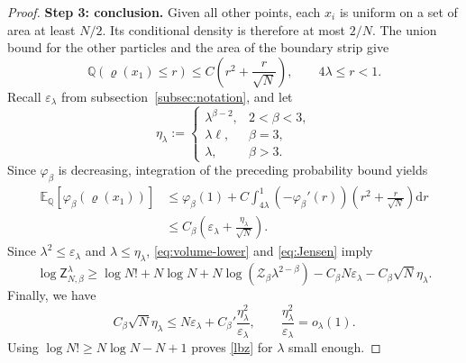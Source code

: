 \documentclass[a4paper,10pt,leqno]{amsart}
\numberwithin{equation}{section}
\newcommand{\dd}{\mathrm{d}}
\def\Esp{\mathbb{E}}
\def\mc{\mathcal}
\def\Z{\mathsf{Z}_{N,\beta}^{\lambda}}
\begin{document}
\begin{proof}
  \smallskip
  \noindent
  \textbf{Step 3: conclusion.}
  Given all other points, each $x_i$ is uniform on a set of area at least $N/2$. Its conditional density is therefore at most $2/N$. The union bound for the other particles and the area of the boundary strip give
  \[
    \mathbb Q(\varrho(x_1)\le r)\le C\left(r^2+\frac r{\sqrt N}\right),\qquad 4\lambda\le r<1.
  \]
  Recall $\varepsilon_\lambda$ from subsection~\ref{subsec:notation}, and let
  \[
    \eta_\lambda:=\begin{cases}
      \lambda^{\beta-2},&2<\beta<3,\\
      \lambda\ell,&\beta=3,\\
      \lambda,&\beta>3.
    \end{cases}
  \]
  Since $\varphi_\beta$ is decreasing, integration of the preceding probability bound yields
  \begin{align*}
    \Esp_{\mathbb Q}[\varphi_\beta(\varrho(x_1))]
    &\le\varphi_\beta(1)+C\int_{4\lambda}^1(-\varphi_\beta'(r))\left(r^2+\frac r{\sqrt N}\right)\dd r\\
    &\le C_\beta\left(\varepsilon_\lambda+\frac{\eta_\lambda}{\sqrt N}\right).
  \end{align*}
  Since $\lambda^2\le\varepsilon_\lambda$ and $\lambda\le\eta_\lambda$, \eqref{eq:volume-lower} and \eqref{eq:Jensen} imply
  \begin{equation*}
    \log\Z\ge\log N!+N\log N+N\log(\mc Z_\beta\lambda^{2-\beta})
    -C_\beta N\varepsilon_\lambda-C_\beta\sqrt N\eta_\lambda.
  \end{equation*}
  Finally, we have
  \[
    C_\beta\sqrt N\eta_\lambda\le N\varepsilon_\lambda+C_\beta'\frac{\eta_\lambda^2}{\varepsilon_\lambda},\qquad
    \frac{\eta_\lambda^2}{\varepsilon_\lambda}=o_\lambda(1).
  \]
  Using $\log N!\ge N\log N-N+1$ proves \eqref{lbz} for $\lambda$ small enough.
\end{proof}

\medskip
\end{document}
